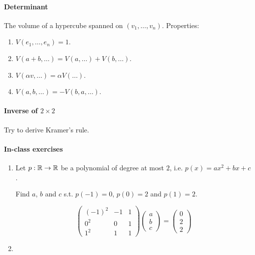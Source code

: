 \documentclass{article}
\begin{document}
\paragraph{Determinant} The volume of a hypercube spanned on $(v_1,\dots,v_n)$. Properties:
\begin{enumerate}
    \item $V(e_1, \dots, e_n) = 1$.
    \item $V(a+b, \dots) = V(a, \dots) + V(b, \dots)$.
    \item $V(\alpha v, \dots) = \alpha V(\dots)$.
    \item $V(a, b, \dots) = -V(b, a, \dots)$.
\end{enumerate}

\paragraph{Inverse of $2 \times 2$} Try to derive Kramer's rule.

\paragraph{In-class exercises}

\begin{enumerate}
    \item Let $p : \mathbb{R} \to \mathbb{R}$ be a polynomial of degree at most $2$, i.e. $p(x) = ax^2+bx+c$.
    
    Find $a$, $b$ and $c$ s.t. $p(-1)=0$, $p(0)=2$ and $p(1) = 2$.

    $$
    \begin{pmatrix}
        (-1)^2 & -1 & 1 \\
        0^2 & 0 & 1 \\
        1^2 & 1 & 1
    \end{pmatrix} \begin{pmatrix} a \\ b \\ c \end{pmatrix} = 
    \begin{pmatrix}0 \\ 2 \\ 2\end{pmatrix}
    $$
    \item 
\end{enumerate}
\end{document}

